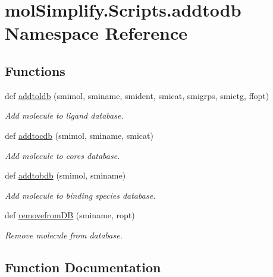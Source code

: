 \hypertarget{namespacemolSimplify_1_1Scripts_1_1addtodb}{}\section{mol\+Simplify.\+Scripts.\+addtodb Namespace Reference}
\label{namespacemolSimplify_1_1Scripts_1_1addtodb}
\subsection*{Functions}
\begin{DoxyCompactItemize}
\item 
def \hyperlink{namespacemolSimplify_1_1Scripts_1_1addtodb_ae93d3c8f0aacc8d5a5b365c779a57069}{addtoldb} (smimol, sminame, smident, smicat, smigrps, smictg, ffopt)
\begin{DoxyCompactList}\small\item\em Add molecule to ligand database. \end{DoxyCompactList}\item 
def \hyperlink{namespacemolSimplify_1_1Scripts_1_1addtodb_af576f7afe569fc2955824d902234ca5c}{addtocdb} (smimol, sminame, smicat)
\begin{DoxyCompactList}\small\item\em Add molecule to cores database. \end{DoxyCompactList}\item 
def \hyperlink{namespacemolSimplify_1_1Scripts_1_1addtodb_aa4651424124ed84a7d12cffc9abe28f2}{addtobdb} (smimol, sminame)
\begin{DoxyCompactList}\small\item\em Add molecule to binding species database. \end{DoxyCompactList}\item 
def \hyperlink{namespacemolSimplify_1_1Scripts_1_1addtodb_a0fe75638645c542731fab8314d6a496f}{removefrom\+DB} (sminame, ropt)
\begin{DoxyCompactList}\small\item\em Remove molecule from database. \end{DoxyCompactList}\end{DoxyCompactItemize}


\subsection{Function Documentation}
\mbox{\label{namespacemolSimplify_1_1Scripts_1_1addtodb_aa4651424124ed84a7d12cffc9abe28f2}} 
